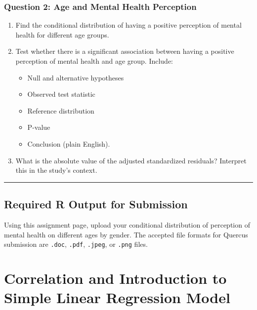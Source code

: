\documentclass[oneside,openany]{book}
\providecommand{\tightlist}{%
  \setlength{\itemsep}{0pt}\setlength{\parskip}{0pt}}
\begin{document}
\subsection{Question 2: Age and Mental Health Perception}\label{question-2-age-and-mental-health-perception}

\begin{enumerate}
\def\labelenumi{\arabic{enumi}.}
\tightlist
\item
  Find the conditional distribution of having a positive perception of mental health for different age groups.
\item
  Test whether there is a significant association between having a positive perception of mental health and age group. Include:

  \begin{itemize}
  \tightlist
  \item
    Null and alternative hypotheses
  \item
    Observed test statistic
  \item
    Reference distribution
  \item
    P-value
  \item
    Conclusion (plain English).
  \end{itemize}
\item
  What is the absolute value of the adjusted standardized residuals? Interpret this in the study's context.
\end{enumerate}

\begin{center}\rule{0.5\linewidth}{0.5pt}\end{center}

\section{Required R Output for Submission}\label{required-r-output-for-submission-5}

Using this assignment page, upload your conditional distribution of perception of mental health on different ages by gender. The accepted file formats for Quercus submission are \texttt{.doc}, \texttt{.pdf}, \texttt{.jpeg}, or \texttt{.png} files.

\chapter{Correlation and Introduction to Simple Linear Regression Model}\label{activity-10---correlation-and-introduction-to-simple-linear-regression-model}
\end{document}
